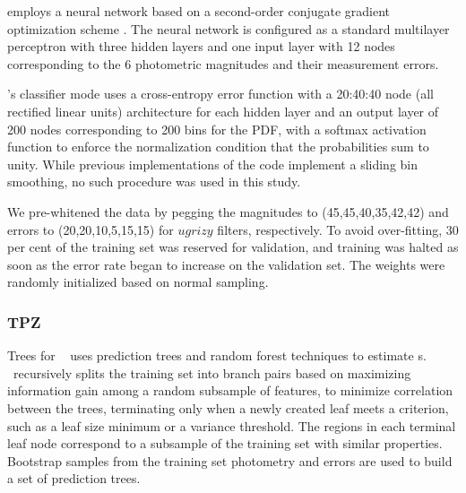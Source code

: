 \skynet \citep{Graff:14} employs a neural network based on a second-order conjugate gradient optimization scheme \citep[see][for further details]{Graff:14}. %
The neural network is configured as a standard multilayer perceptron with three hidden layers and one input layer with 12 nodes corresponding to the 6 photometric magnitudes and their measurement errors.

\skynet's classifier mode uses a cross-entropy error function with a 20:40:40 node (all rectified linear units) architecture for each hidden layer and an output layer of 200 nodes corresponding to 200 bins for the PDF, with a softmax activation function to enforce the normalization condition that the probabilities sum to unity.
While previous implementations of the code \citep[see Appendix C.3 of~][]{Sanchez:14,Bonnett:15} implement a sliding bin smoothing, no such procedure was used in this study.

We pre-whitened the data by pegging the magnitudes to (45,45,40,35,42,42) and errors to (20,20,10,5,15,15) for $ugrizy$ filters, respectively.
To avoid over-fitting, $30$ per cent of the training set was reserved for validation, and training was halted as soon as the error rate began to increase on the validation set.
The weights were randomly initialized based on normal sampling.

\subsubsection{TPZ}
\label{sec:tpz}

Trees for \Pz\ \citep[\tpz,][]{Carrasco_Kind:13,Carrascokind:14} uses prediction trees and random forest techniques to estimate \pzpdf s.
\tpz\ recursively splits the training set into branch pairs based on maximizing information gain among a random subsample of features, to minimize correlation between the trees, terminating only when a newly created leaf meets a criterion, such as a leaf size minimum or a variance threshold.
The regions in each terminal leaf node correspond to a subsample of the training set with similar properties.
Bootstrap samples from the training set photometry and errors are used to build a set of prediction trees.

